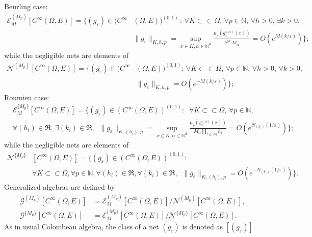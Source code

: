 \documentclass[sn-mathphys,Numbered]{sn-jnl}%
\theoremstyle{thmstyleone}%
\theoremstyle{thmstyletwo}%
\theoremstyle{thmstylethree}%
\begin{document}
Beurling case:
\begin{align*}
\mathcal{E}^{(M_p)}_M[C^\infty(\Omega,E)] = 
\Bigg \{(g_\varepsilon) \in (C^\infty&(\Omega,E))^{(0,1)}\,: \, \forall K\subset \subset \Omega,  \,\forall p\in\mathbb N, \,\forall h>0,  \,\exists k>0,\\
& \|g_\varepsilon\|_{K,h,p}=\sup_{x\in K, \alpha\in \mathbb{N}^d}\frac{\mu_p(g^{(\alpha)}_{\varepsilon}(x))}{h^{|\alpha|} M_\alpha} =O(e^{M(k/\varepsilon)})\Bigg\};
\end{align*}  
while the negligible nets are elements of %
\begin{align*}
\mathcal{N}^{(M_p)}[C^\infty(\Omega,E)] =  \Big\{(g_\varepsilon) \in (C^\infty& (\Omega,E))^{(0,1)}: \, \forall K\subset \subset \Omega, \,\forall p\in\mathbb N, \,\forall h>0, \, \forall k>0,\\
&\|g_\varepsilon\|_{K,h,p}=O(e^{-M(k/\varepsilon)})\Big\};
\end{align*}  
Roumieu case:
\begin{align*}
&\mathcal{E}^{\{M_p\}}_M[C^\infty(\Omega,E)] =\Bigg \{(g_{\varepsilon}) \in (C^\infty(\Omega,E))^{(0,1)}:\;\; \forall K\subset \subset \Omega, \,\forall p\in\mathbb N, \\
& \forall (h_i)\in\mathfrak R, \,\exists (k_i)\in\mathfrak R, \;\; \|g_\varepsilon\|_{K,(h_i),p}=\sup_{x\in K, \alpha\in \mathbb{N}^d}\frac{\mu_p(g^{(\alpha)}_{\varepsilon}(x))}{M_\alpha \prod_{i\leq |\alpha|}h_i} =O(e^{N_{(k_i)}(1/{\varepsilon})})\Bigg\};
\end{align*}  
while the negligible nets are elements of %
\begin{align*}
\mathcal{N}^{\{M_p\}}& [C^\infty(\Omega,E)] =\Big \{(g_{\varepsilon}) \in (C^\infty(\Omega,E))^{(0,1)}: \\
& \forall K\subset \subset \Omega,  \forall p\in\mathbb N,  \forall (h_i)\in\mathfrak R, \forall (k_i)\in\mathfrak R, \;\;\|g_\varepsilon\|_{K,(h_i),p} =O(e^{-N_{(k_i)}(1/{\varepsilon})})\Big\}.
\end{align*}  
Generalized algebras are defined by 
\begin{align*}
\mathcal{G}^{(M_p)} [C^\infty(\Omega,E)] & =   \mathcal{E}^{(M_p)}_M [C^\infty(\Omega,E)] /\mathcal{N}^{(M_p)}[C^\infty(\Omega,E)],\\
\mathcal{G}^{\{M_p\}} [C^\infty(\Omega,E)] & =   \mathcal{E}^{\{M_p\}}_M [C^\infty(\Omega,E)] /\mathcal{N}^{\{M_p\}}[C^\infty(\Omega,E)].
\end{align*}
As in usual Colombeau algebra, the class of a net $(g_{\varepsilon})$ is denoted as $[(g_{\varepsilon})]$.
 
\end{document}
